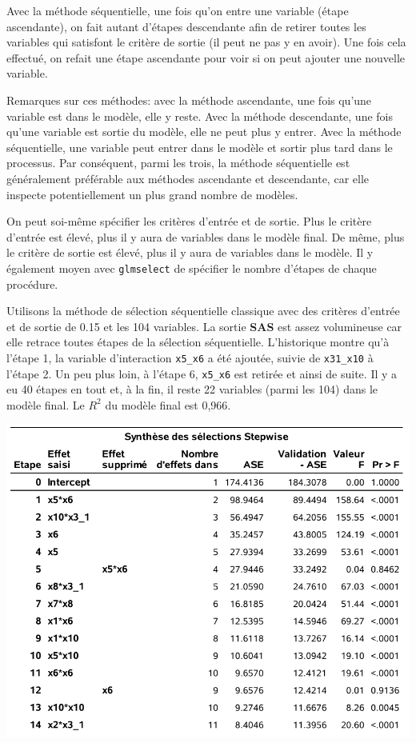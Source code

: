 \documentclass[
  11pt,
  letterpaper,
]{book}
\theoremstyle{definition}
\theoremstyle{definition}
\theoremstyle{definition}
\theoremstyle{definition}
\theoremstyle{remark}
\begin{document}
Avec la méthode séquentielle, une fois qu'on entre une variable (étape ascendante), on fait autant d'étapes descendante afin de retirer toutes les variables qui satisfont le critère de sortie (il peut ne pas y en avoir). Une fois cela effectué, on refait une étape ascendante pour voir si on peut ajouter une nouvelle variable.

Remarques sur ces méthodes: avec la méthode ascendante, une fois qu'une variable est dans le modèle, elle y reste. Avec la méthode descendante, une fois qu'une variable est sortie du modèle, elle ne peut plus y entrer. Avec la méthode séquentielle, une variable peut entrer dans le modèle et sortir plus tard dans le processus. Par conséquent, parmi les trois, la méthode séquentielle est généralement préférable aux méthodes ascendante et descendante, car elle inspecte potentiellement un plus grand nombre de modèles.

On peut soi-même spécifier les critères d'entrée et de sortie. Plus le critère d'entrée est élevé, plus il y aura de variables dans le modèle final. De même, plus le critère de sortie est élevé, plus il y aura de variables dans le modèle. Il y également moyen avec \texttt{glmselect} de spécifier le nombre d'étapes de chaque procédure.

Utilisons la méthode de sélection séquentielle classique avec des critères d'entrée et de sortie de 0.15 et les 104 variables.
La sortie \textbf{SAS} est assez volumineuse car elle retrace toutes étapes de la sélection séquentielle. L'historique montre qu'à l'étape 1, la variable d'interaction \texttt{x5\_x6} a été ajoutée, suivie de \texttt{x31\_x10} à l'étape 2. Un peu plus loin, à l'étape 6, \texttt{x5\_x6} est retirée et ainsi de suite. Il y a eu 40 étapes en tout et, à la fin, il reste 22 variables (parmi les 104) dans le modèle final. Le \(R^2\) du modèle final est 0,966.

\begin{center}\includegraphics[width=0.9\linewidth]{figures/02-select-e8} \end{center}
\end{document}
